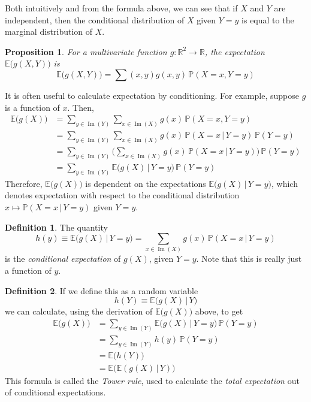 \documentclass{article}
\DeclareMathOperator{\im}{Im}
\newtheorem{proposition}[theorem]{Proposition}
\theoremstyle{remark}
\theoremstyle{definition}
\newtheorem{definition}{Definition}[section]
\begin{document}
Both intuitively and from the formula above, we can see that if $X$ and $Y$ are independent, then the conditional distribution of $X$ given $Y=y$ is equal to the marginal distribution of $X$. 

\begin{proposition}
For a multivariate function $g: \mathbb{R}^2 \longrightarrow \mathbb{R}$, the expectation $\mathbb{E} \big( g(X, Y) \big)$ is 
\[\mathbb{E} \big( g(X, Y)\big) = \sum{(x, y)} g(x, y) \, \mathbb{P}(X=x, Y=y)\]
\end{proposition}

It is often useful to calculate expectation by conditioning. For example, suppose $g$ is a function of $x$. Then, 
\begin{align*}
    \mathbb{E}\big(g(X)\big) & = \sum_{y \in \im(Y)} \sum_{x \in \im(X)} g(x) \, \mathbb{P}(X = x, Y = y) \\
    & = \sum_{y \in \im(Y)} \sum_{x \in \im(X)} g(x) \, \mathbb{P}(X = x \, | \, Y = y) \, \mathbb{P}(Y=y) \\
    & = \sum_{y \in \im(Y)} \bigg( \sum_{x \in \im(X)} g(x) \, \mathbb{P}(X = x \, | \, Y = y)  \bigg) \, \mathbb{P}(Y = y) \\
    & = \sum_{y \in \im(Y)} \mathbb{E}\big( g(X) \, | \, Y = y \big) \, \mathbb{P}(Y=y)
\end{align*}
Therefore, $\mathbb{E}\big( g(X)\big)$ is dependent on the expectations $\mathbb{E} \big( g(X) \, | \, Y = y\big)$, which denotes expectation with respect to the conditional distribution $x \mapsto \mathbb{P}(X = x \, | \, Y = y)$ given $Y = y$.

\begin{definition}
The quantity
\[h(y) \equiv \mathbb{E} \big( g(X) \, | \, Y=y\big) = \sum_{x \in \im(X)} g(x) \, \mathbb{P}(X = x \, | \, Y = y)\]
is the \textit{conditional expectation} of $g(X)$, given $Y = y$. Note that this is really just a function of $y$. 
\end{definition}

\begin{definition}
If we define this as a random variable 
\[h(Y) \equiv \mathbb{E} \big( g(X) \,|\,Y\big)\]
we can calculate, using the derivation of $\mathbb{E}\big(g(X)\big)$ above, to get
\begin{align*}
    \mathbb{E}\big(g(X)\big) & = \sum_{y \in \im(Y)} \mathbb{E} \big( g(X) \, | \, Y = y\big) \, \mathbb{P}(Y = y) \\
    & = \sum_{y \in \im(Y)} h(y) \, \mathbb{P}(Y = y) \\
    & = \mathbb{E}\big(h(Y)\big) \\
    & = \mathbb{E} \big( \mathbb{E}(g(X) \, | \, Y ) \big) 
\end{align*}
This formula is called the \textit{Tower rule}, used to calculate the \textit{total expectation} out of conditional expectations. 
\end{definition}
\end{document}
